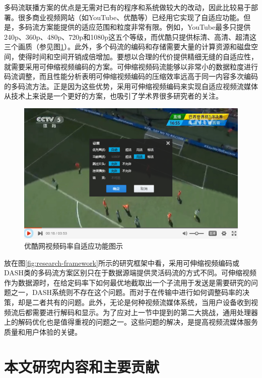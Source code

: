 多码流联播方案的优点是无需对已有的程序和系统做较大的改动，因此比较易于部署\supercite{Bouten2014}。很多商业视频网站（如YouTube、优酷等）已经用它实现了自适应功能。但是，多码流方案能提供的适应范围和粒度非常有限。例如，YouTube最多只提供240p、360p、480p、720p和1080p这五个等级，而优酷只提供标清、高清、超清这三个画质（参见图\ref{fig:13}）。此外，多个码流的编码和存储需要大量的计算资源和磁盘空间，使得时间和空间开销成倍增加。要想以合理的代价提供精细无缝的自适应性，就需要采用可伸缩视频编码的方案。可伸缩视频码流能够以非常小的数据粒度进行码流调整，而且性能分析表明可伸缩视频编码的压缩效率远高于同一内容多次编码的多码流方法\supercite{SVC-Performance}。正是因为这些优势，采用可伸缩视频编码来实现自适应视频流媒体从技术上来说是一个更好的方案，也吸引了学术界很多研究者的关注\supercite{Chuah2012, Zhu2013, Dan2013, Yang2014, Cicalo2014}。

\begin{figure}[h]
	\centering
	\includegraphics[width = 1.0\linewidth]{clip/13.png}
	\caption{优酷网视频码率自适应功能图示\label{fig:13}}
\end{figure}

放在图\ref{fig:research-framework}所示的研究框架中看，采用可伸缩视频编码或DASH类的多码流方案区别只在于数据源端提供灵活码流的方式不同。可伸缩视频作为数据源时，在给定码率下如何最优地截取出一个子流用于发送是需要研究的问题之一，DASH系统则不存在这个问题。而对于在传输中进行如何调整码率的决策，却是二者共有的问题。此外，无论是何种视频流媒体系统，当用户设备收到视频流后都需要进行解码和显示。为了应对上一节中提到的第二大挑战，通用处理器上的解码优化也是值得重视的问题之一。这些问题的解决，是提高视频流媒体服务质量和用户体验的关键。

\section{本文研究内容和主要贡献}

